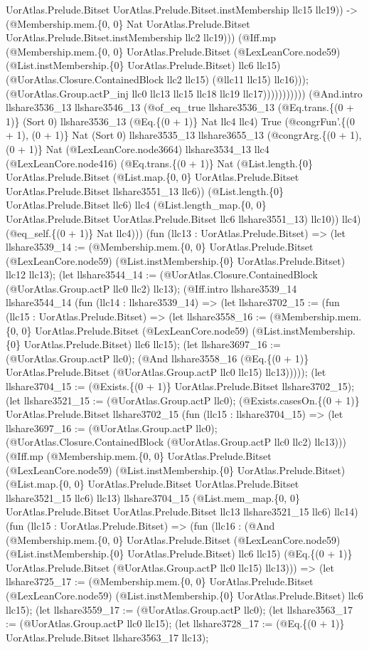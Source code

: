 \documentclass[11pt]{article}
\begin{document}
UorAtlas.Prelude.Bitset UorAtlas.Prelude.Bitset.instMembership llc15 llc19)) -> (@Membership.mem.\{0, 0\} Nat UorAtlas.Prelude.Bitset UorAtlas.Prelude.Bitset.instMembership llc2 llc19))) (@Iff.mp (@Membership.mem.\{0, 0\} UorAtlas.Prelude.Bitset (@LexLeanCore.node59) (@List.instMembership.\{0\} UorAtlas.Prelude.Bitset) llc6 llc15) (@UorAtlas.Closure.ContainedBlock llc2 llc15) (@llc11 llc15) llc16))); (@UorAtlas.Group.actP\_inj llc0 llc13 llc15 llc18 llc19 llc17))))))))))) (@And.intro llshare3536\_13 llshare3546\_13 (@of\_eq\_true llshare3536\_13 (@Eq.trans.\{(0 + 1)\} (Sort 0) llshare3536\_13 (@Eq.\{(0 + 1)\} Nat llc4 llc4) True (@congrFun'.\{(0 + 1), (0 + 1)\} Nat (Sort 0) llshare3535\_13 llshare3655\_13 (@congrArg.\{(0 + 1), (0 + 1)\} Nat (@LexLeanCore.node3664) llshare3534\_13 llc4 (@LexLeanCore.node416) (@Eq.trans.\{(0 + 1)\} Nat (@List.length.\{0\} UorAtlas.Prelude.Bitset (@List.map.\{0, 0\} UorAtlas.Prelude.Bitset UorAtlas.Prelude.Bitset llshare3551\_13 llc6)) (@List.length.\{0\} UorAtlas.Prelude.Bitset llc6) llc4 (@List.length\_map.\{0, 0\} UorAtlas.Prelude.Bitset UorAtlas.Prelude.Bitset llc6 llshare3551\_13) llc10)) llc4) (@eq\_self.\{(0 + 1)\} Nat llc4))) (fun (llc13 : UorAtlas.Prelude.Bitset) => (let llshare3539\_14 := (@Membership.mem.\{0, 0\} UorAtlas.Prelude.Bitset (@LexLeanCore.node59) (@List.instMembership.\{0\} UorAtlas.Prelude.Bitset) llc12 llc13); (let llshare3544\_14 := (@UorAtlas.Closure.ContainedBlock (@UorAtlas.Group.actP llc0 llc2) llc13); (@Iff.intro llshare3539\_14 llshare3544\_14 (fun (llc14 : llshare3539\_14) => (let llshare3702\_15 := (fun (llc15 : UorAtlas.Prelude.Bitset) => (let llshare3558\_16 := (@Membership.mem.\{0, 0\} UorAtlas.Prelude.Bitset (@LexLeanCore.node59) (@List.instMembership.\{0\} UorAtlas.Prelude.Bitset) llc6 llc15); (let llshare3697\_16 := (@UorAtlas.Group.actP llc0); (@And llshare3558\_16 (@Eq.\{(0 + 1)\} UorAtlas.Prelude.Bitset (@UorAtlas.Group.actP llc0 llc15) llc13))))); (let llshare3704\_15 := (@Exists.\{(0 + 1)\} UorAtlas.Prelude.Bitset llshare3702\_15); (let llshare3521\_15 := (@UorAtlas.Group.actP llc0); (@Exists.casesOn.\{(0 + 1)\} UorAtlas.Prelude.Bitset llshare3702\_15 (fun (llc15 : llshare3704\_15) => (let llshare3697\_16 := (@UorAtlas.Group.actP llc0); (@UorAtlas.Closure.ContainedBlock (@UorAtlas.Group.actP llc0 llc2) llc13))) (@Iff.mp (@Membership.mem.\{0, 0\} UorAtlas.Prelude.Bitset (@LexLeanCore.node59) (@List.instMembership.\{0\} UorAtlas.Prelude.Bitset) (@List.map.\{0, 0\} UorAtlas.Prelude.Bitset UorAtlas.Prelude.Bitset llshare3521\_15 llc6) llc13) llshare3704\_15 (@List.mem\_map.\{0, 0\} UorAtlas.Prelude.Bitset UorAtlas.Prelude.Bitset llc13 llshare3521\_15 llc6) llc14) (fun (llc15 : UorAtlas.Prelude.Bitset) => (fun (llc16 : (@And (@Membership.mem.\{0, 0\} UorAtlas.Prelude.Bitset (@LexLeanCore.node59) (@List.instMembership.\{0\} UorAtlas.Prelude.Bitset) llc6 llc15) (@Eq.\{(0 + 1)\} UorAtlas.Prelude.Bitset (@UorAtlas.Group.actP llc0 llc15) llc13))) => (let llshare3725\_17 := (@Membership.mem.\{0, 0\} UorAtlas.Prelude.Bitset (@LexLeanCore.node59) (@List.instMembership.\{0\} UorAtlas.Prelude.Bitset) llc6 llc15); (let llshare3559\_17 := (@UorAtlas.Group.actP llc0); (let llshare3563\_17 := (@UorAtlas.Group.actP llc0 llc15); (let llshare3728\_17 := (@Eq.\{(0 + 1)\} UorAtlas.Prelude.Bitset llshare3563\_17 llc13); 
\end{document}

